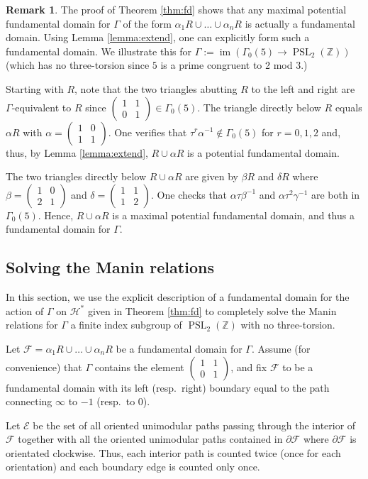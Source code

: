 \documentclass{amsart}
\theoremstyle{plain}
\theoremstyle{definition}
\newtheorem{remark}[thm]{Remark}
\newcommand{\E}{{\mathcal E}}
\newcommand{\F}{{\mathcal F}}
\renewcommand{\H}{\mathcal H}
\newcommand{\Z}{{\mathbb Z}}
\newcommand{\maps}{\rightarrow}
\newcommand{\psmallmat}[4]{\left( \begin{smallmatrix} #1 & #2 \\ #3 & #4 \end{smallmatrix} \right)}
\DeclareMathOperator{\PSL}{PSL}
\DeclareMathOperator{\im}{im}
\begin{document}
\begin{remark}
\label{rmk:fd}
The proof of Theorem \ref{thm:fd} shows that any maximal potential
fundamental domain for $\Gamma$ of the form $\alpha_1 R \cup \dots
\cup \alpha_n R$ is actually a fundamental domain.  Using Lemma
\ref{lemma:extend}, one can explicitly form such a fundamental
domain. We illustrate this for $\Gamma := \im(\Gamma_0(5) \maps
\PSL_2(\Z))$ (which has no three-torsion since $5$ is a prime
congruent to 2 mod 3.)

Starting with $R$, note that the two triangles abutting $R$ to the
left and right are $\Gamma$-equivalent to $R$ since $\left(
\begin{smallmatrix} 1 & 1
\\ 0 & 1 \end{smallmatrix} \right) \in \Gamma_0(5)$.  The triangle
directly below $R$ equals $\alpha R$ with $\alpha =
\psmallmat{1}{0}{1}{1}$.  One verifies that $\tau^r \alpha^{-1}
\notin \Gamma_0(5)$ for $r=0,1,2$ and, thus, by Lemma
\ref{lemma:extend}, $R \cup \alpha R$ is a potential fundamental
domain.

The two triangles directly below $R \cup \alpha R$
are given by $\beta R$ and $\delta R$ where $\beta =
\psmallmat{1}{0}{2}{1}$ and $\delta = \psmallmat{1}{1}{1}{2}$. One
checks that $\alpha \tau \beta^{-1}$ and $\alpha \tau^2
\gamma^{-1}$ are both in $\Gamma_0(5)$.  Hence, $R \cup \alpha R$
is a maximal potential fundamental domain, and thus a fundamental
domain for $\Gamma$.
\end{remark}

\subsection{Solving the Manin relations}
\label{sec:solvemanin}

In this section, we use the explicit description of a fundamental domain for the action of $\Gamma$ on $\H^*$ given in Theorem \ref{thm:fd} to completely solve the Manin relations for $\Gamma$ a finite index subgroup of $\PSL_2(\Z)$ with no three-torsion.

Let $\F = \alpha_1 R \cup \dots \cup \alpha_n R$ be a fundamental domain for $\Gamma$.  Assume (for convenience) that $\Gamma$ contains the element $\psmallmat{1}{1}{0}{1}$, and fix $\F$ to be a fundamental domain with its left (resp.\ right) boundary equal to the path connecting $\infty$ to $-1$ (resp.\ to $0$).

Let $\E$ be the set of all oriented unimodular paths passing through the interior of $\F$ together with all the oriented unimodular paths contained in $\partial \F$ where $\partial \F$ is orientated clockwise.  Thus, each interior path is counted twice (once for each orientation) and each boundary edge is counted only once.
\end{document}
